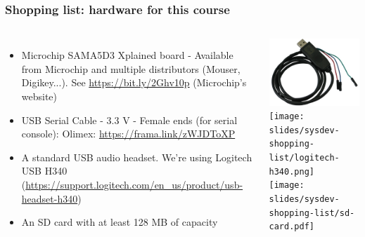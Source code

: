 \begin{frame}
\frametitle{Shopping list: hardware for this course}
  \begin{columns}
    \footnotesize
    \begin{itemize}
      \item Microchip SAMA5D3 Xplained board - Available from Microchip and
	    multiple distributors (Mouser, Digikey...).
	    See \url{https://bit.ly/2Ghv10p} (Microchip's website)
      \item USB Serial Cable - 3.3 V - Female ends (for serial console):
	    Olimex: \url{https://frama.link/zWJDToXP} \\
      \item A standard USB audio headset. We're using Logitech USB H340
            (\url{https://support.logitech.com/en_us/product/usb-headset-h340})
      \item An SD card with at least 128 MB of capacity
    \end{itemize}
    \includegraphics[height=0.20\textheight]{common/usb-serial-cable-female.png} \\
    \vspace{1cm}
    \texttt{[image: slides/sysdev-shopping-list/logitech-h340.png]} \\
    \vspace{1cm}
    \texttt{[image: slides/sysdev-shopping-list/sd-card.pdf]}
  \end{columns}
\end{frame}
